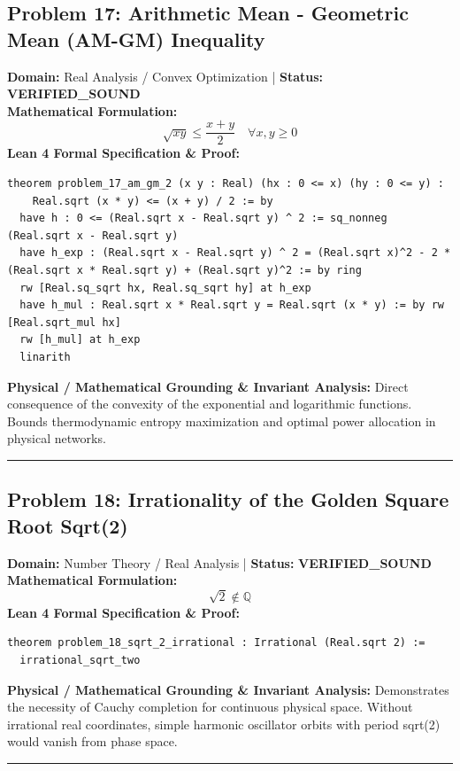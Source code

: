 \documentclass[10pt,a4paper]{article}
\begin{document}
\subsection*{Problem 17: Arithmetic Mean - Geometric Mean (AM-GM) Inequality}
\textbf{Domain:} Real Analysis / Convex Optimization \quad | \quad \textbf{Status:} \textcolor{green!70!black}{\textbf{VERIFIED\_SOUND}}\\
\textbf{Mathematical Formulation:}
\begin{equation*}
  \sqrt{x y} \le \frac{x + y}{2} \quad \forall x, y \ge 0
\end{equation*}
\textbf{Lean 4 Formal Specification \& Proof:}
\begin{lstlisting}
theorem problem_17_am_gm_2 (x y : Real) (hx : 0 <= x) (hy : 0 <= y) : 
    Real.sqrt (x * y) <= (x + y) / 2 := by
  have h : 0 <= (Real.sqrt x - Real.sqrt y) ^ 2 := sq_nonneg (Real.sqrt x - Real.sqrt y)
  have h_exp : (Real.sqrt x - Real.sqrt y) ^ 2 = (Real.sqrt x)^2 - 2 * (Real.sqrt x * Real.sqrt y) + (Real.sqrt y)^2 := by ring
  rw [Real.sq_sqrt hx, Real.sq_sqrt hy] at h_exp
  have h_mul : Real.sqrt x * Real.sqrt y = Real.sqrt (x * y) := by rw [Real.sqrt_mul hx]
  rw [h_mul] at h_exp
  linarith
\end{lstlisting}
\textbf{Physical / Mathematical Grounding \& Invariant Analysis:}
Direct consequence of the convexity of the exponential and logarithmic functions. Bounds thermodynamic entropy maximization and optimal power allocation in physical networks.
\vspace{0.8em}\hrule\vspace{0.8em}
\subsection*{Problem 18: Irrationality of the Golden Square Root Sqrt(2)}
\textbf{Domain:} Number Theory / Real Analysis \quad | \quad \textbf{Status:} \textcolor{green!70!black}{\textbf{VERIFIED\_SOUND}}\\
\textbf{Mathematical Formulation:}
\begin{equation*}
  \sqrt{2} \notin \mathbb{Q}
\end{equation*}
\textbf{Lean 4 Formal Specification \& Proof:}
\begin{lstlisting}
theorem problem_18_sqrt_2_irrational : Irrational (Real.sqrt 2) :=
  irrational_sqrt_two
\end{lstlisting}
\textbf{Physical / Mathematical Grounding \& Invariant Analysis:}
Demonstrates the necessity of Cauchy completion for continuous physical space. Without irrational real coordinates, simple harmonic oscillator orbits with period sqrt(2) would vanish from phase space.
\vspace{0.8em}\hrule\vspace{0.8em}
\end{document}
